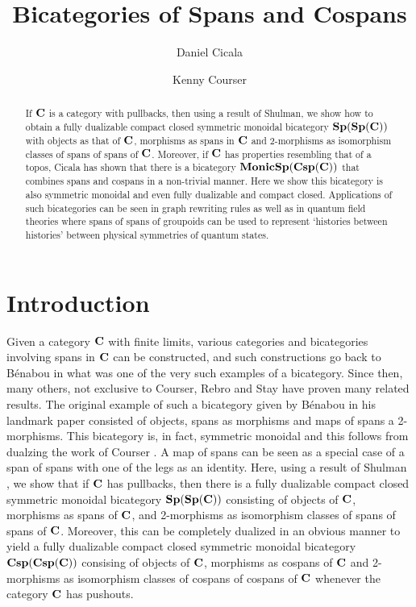 \documentclass[11pt]{amsart}
\theoremstyle{remark}
\theoremstyle{definition}
\begin{document}
	

\begin{abstract}
If $\bold{C}$ is a category with pullbacks, then using a result of Shulman, we show how to obtain a fully dualizable compact closed symmetric monoidal bicategory $\bold{Sp(Sp(C))}$ with objects as that of $\bold{C}$, morphisms as spans in $\bold{C}$ and 2-morphisms as isomorphism classes of spans of spans of $\bold{C}$. Moreover, if $\bold{C}$ has properties resembling that of a topos, Cicala has shown that there is a bicategory $\bold{MonicSp(Csp(C))}$ that combines spans and cospans in a non-trivial manner. Here we show this bicategory is also symmetric monoidal and even fully dualizable and compact closed. Applications of such bicategories can be seen in graph rewriting rules as well as in quantum field theories where spans of spans of groupoids can be used to represent `histories between histories' between physical symmetries of quantum states.
\end{abstract}

\title{Bicategories of Spans and Cospans}
\author{Daniel Cicala \and Kenny Courser}
\maketitle

\section{Introduction} %
\label{sec:Introduction}
Given a category $\bold{C}$ with finite limits, various categories and bicategories involving spans in $\bold{C}$ can be constructed, and such constructions go back to B\'enabou \cite{Be} in what was one of the very such examples of a bicategory. Since then, many others, not exclusive to Courser, Rebro and Stay \cite{Cour,Reb,Stay} have proven many related results. The original example of such a bicategory given by B\'enabou \cite{Be} in his landmark paper consisted of objects, spans as morphisms and maps of spans a 2-morphisms. This bicategory is, in fact, symmetric monoidal and this follows from dualzing the work of Courser \cite{Cour}. A map of spans can be seen as a special case of a span of spans with one of the legs as an identity. Here, using a result of Shulman \cite{Shul}, we show that if $\bold{C}$ has pullbacks, then there is a fully dualizable compact closed symmetric monoidal bicategory $\bold{Sp(Sp(C))}$ consisting of objects of $\bold{C}$, morphisms as spans of $\bold{C}$, and 2-morphisms as isomorphism classes of spans of spans of $\bold{C}$. Moreover, this can be completely dualized in an obvious manner to yield a fully dualizable compact closed symmetric monoidal bicategory $\bold{Csp(Csp(C))}$ consising of objects of $\bold{C}$, morphisms as cospans of $\bold{C}$ and 2-morphisms as isomorphism classes of cospans of cospans of $\bold{C}$ whenever the category $\bold{C}$ has pushouts.
\end{document}
